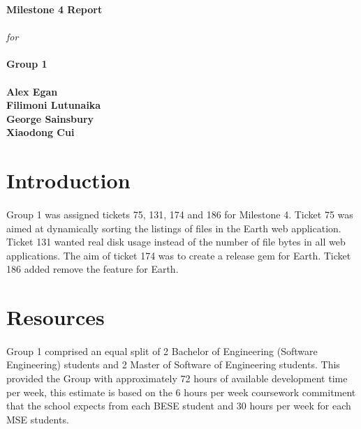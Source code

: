 \documentclass[10pt,a4,oneside]{article}
\begin{document}
\begin{titlepage}
\begin{center}

\vfill
\textbf{\huge Milestone 4 Report}\\ \textit{} \\ \textit{} 
\textit{for} \\ \textit{} \\ \textit{} 
\textbf{\huge Group 1}\\ \textit{} \\ \textit{}
\vfill
\textbf{Alex Egan \\ Filimoni Lutunaika \\ George Sainsbury \\ Xiaodong Cui}
\end{center}
\end{titlepage}

\newpage

\paragraph{}

\tableofcontents

\newpage

\section{Introduction}

\paragraph{}
Group 1 was assigned tickets 75, 131, 174 and 186 for Milestone 4. Ticket 75 was aimed at dynamically sorting the listings of files in the Earth web application. Ticket 131 wanted real disk usage instead of the number of file bytes in all web applications. The aim of ticket 174 was to create a release gem for Earth. Ticket 186 added remove the feature for Earth.

\section{Resources}

\paragraph{}
Group 1 comprised an equal split of 2 Bachelor of Engineering (Software Engineering)
 students and 2 Master of Software of Engineering students. This provided the Group with
  approximately 72 hours of available development time per week, this estimate is based on 
  the 6 hours per week coursework commitment that the school expects from each BESE student 
  and 30 hours per week for each MSE students.
\end{document}
